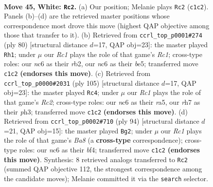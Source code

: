 \documentclass[11pt]{article}
\begin{document}
\clearpage

\begin{figure}[p]\centering
\begin{subfigure}{0.46\textwidth}\centering
\resizebox{\linewidth}{!}{%
\newchessgame
\chessboard[
  setfen={6k1/7r/p1n5/5P2/1P6/2B5/P3b1K1/2R5 w - - 1 45},
  showmover=false,
  pgfstyle=straightmove, color=movearrow, markmove={c1-c2}
]}
\caption{}
\end{subfigure}\hfill
\begin{subfigure}{0.46\textwidth}\centering
\resizebox{\linewidth}{!}{%
\newchessgame
\chessboard[
  setfen={8/8/8/1P2b1kp/2B5/5KP1/1r6/2R5 w - - 1 41},
  showmover=false,
  pgfstyle=straightmove, color=movearrow, markmove={c1-h1}
]}
\caption{}
\end{subfigure}
\\[4pt]
\begin{subfigure}{0.46\textwidth}\centering
\resizebox{\linewidth}{!}{%
\newchessgame
\chessboard[
  setfen={8/2r1bp2/7k/R7/4B1K1/p6P/P7/8 b - - 6 53},
  showmover=false,
  pgfstyle=straightmove, color=movearrow, markmove={c7-c4}
]}
\caption{}
\end{subfigure}\hfill
\begin{subfigure}{0.46\textwidth}\centering
\resizebox{\linewidth}{!}{%
\newchessgame
\chessboard[
  setfen={B1bB4/2P3k1/8/2K5/5b2/p5p1/P7/8 w - - 0 48},
  showmover=false,
  pgfstyle=straightmove, color=movearrow, markmove={a8-g2}
]}
\caption{}
\end{subfigure}
\caption{\textbf{Move 45, White: \texttt{Rc2}.} (a) Our position; Melanie plays \texttt{Rc2} (\texttt{c1c2}). Panels (b)--(d) are the retrieved master positions whose correspondence most drove this move (highest QAP objective among those that transfer to it). (b) Retrieved from \texttt{ccrl\_top\_p0001\#274} (ply 80) [structural distance $d$=17, QAP obj=23]: the master played \texttt{Rh1}; under $\mu$ our \emph{Rc1} plays the role of that game's \emph{Rc1}; cross-type roles: our \emph{n}c6 as their \emph{r}b2, our \emph{n}c6 as their \emph{b}e5; transferred move \texttt{c1c2} \textbf{(endorses this move)}. (c) Retrieved from \texttt{ccrl\_top\_p0000\#2031} (ply 105) [structural distance $d$=17, QAP obj=23]: the master played \texttt{Rc4}; under $\mu$ our \emph{Rc1} plays the role of that game's \emph{Rc2}; cross-type roles: our \emph{n}c6 as their \emph{r}a5, our \emph{r}h7 as their \emph{p}h3; transferred move \texttt{c1c2} \textbf{(endorses this move)}. (d) Retrieved from \texttt{ccrl\_top\_p0002\#710} (ply 94) [structural distance $d$=21, QAP obj=15]: the master played \texttt{Bg2}; under $\mu$ our \emph{Rc1} plays the role of that game's \emph{Ba8} (a \textbf{cross-type} correspondence); cross-type roles: our \emph{n}c6 as their \emph{b}f4; transferred move \texttt{c1c2} \textbf{(endorses this move)}. Synthesis: 8 retrieved analogs transferred to \texttt{Rc2} (summed QAP objective 112, the strongest correspondence among the candidate moves); Melanie committed it via the \texttt{search} selector.}
\label{fig:thought-m88}
\end{figure}
\end{document}
